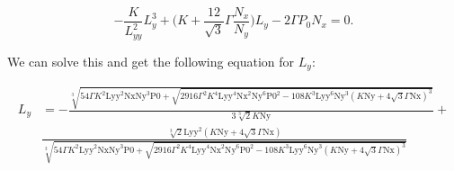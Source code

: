 \documentclass[12pt]{article}
\begin{document}
\begin{center}
\begin{equation}
	-\frac{K}{L_{yy}^2} L_y^3 + \bigg(K + \frac{12}{\sqrt{3}} \Gamma \frac{N_x}{N_y}\bigg) L_y - 2\Gamma P_0 N_x = 0.
\end{equation}
\end{center}
We can solve this and get the following equation for $L_y$:

\begin{center}
	\begin{equation}
		\begin{split}
			L_y &= -\frac{\sqrt[3]{54 \Gamma  K^2 \text{Lyy}^2 \text{Nx} \text{Ny}^3 \text{P0}+\sqrt{2916 \Gamma ^2 K^4 \text{Lyy}^4 \text{Nx}^2 \text{Ny}^6 \text{P0}^2-108 K^3 \text{Lyy}^6 \text{Ny}^3 \left(K \text{Ny}+4 \sqrt{3} \Gamma  \text{Nx}\right)^3}}}{3 \sqrt[3]{2} K \text{Ny}}+\\ &\frac{\sqrt[3]{2} \text{Lyy}^2 \left(K \text{Ny}+4 \sqrt{3} \Gamma  \text{Nx}\right)}{\sqrt[3]{54 \Gamma  K^2 \text{Lyy}^2 \text{Nx} \text{Ny}^3 \text{P0}+\sqrt{2916 \Gamma ^2 K^4 \text{Lyy}^4 \text{Nx}^2 \text{Ny}^6 \text{P0}^2-108 K^3 \text{Lyy}^6 \text{Ny}^3 \left(K \text{Ny}+4 \sqrt{3} \Gamma  \text{Nx}\right)^3}}}
		\end{split}
	\end{equation}
\end{center}
\end{document}
